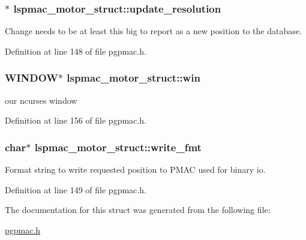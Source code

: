 \hypertarget{structlspmac__motor__struct_aefa84c7592369090eec8b211caaa3a51}{
\subsubsection[{update\-\_\-resolution}]{$\ast$ lspmac\-\_\-motor\-\_\-struct\-::update\-\_\-resolution}}\label{structlspmac__motor__struct_aefa84c7592369090eec8b211caaa3a51}


Change needs to be at least this big to report as a new position to the database. 



Definition at line 148 of file pgpmac.\-h.

\hypertarget{structlspmac__motor__struct_a133775154b0e008f3a2fde6f53bc0eff}{
\subsubsection[{win}]{\setlength{\rightskip}{0pt plus 5cm}W\-I\-N\-D\-O\-W$\ast$ lspmac\-\_\-motor\-\_\-struct\-::win}}\label{structlspmac__motor__struct_a133775154b0e008f3a2fde6f53bc0eff}


our ncurses window 



Definition at line 156 of file pgpmac.\-h.

\hypertarget{structlspmac__motor__struct_a70291ddfe7994c0bec7fc2287cb6dd89}{
\subsubsection[{write\-\_\-fmt}]{\setlength{\rightskip}{0pt plus 5cm}char$\ast$ lspmac\-\_\-motor\-\_\-struct\-::write\-\_\-fmt}}\label{structlspmac__motor__struct_a70291ddfe7994c0bec7fc2287cb6dd89}


Format string to write requested position to P\-M\-A\-C used for binary io. 



Definition at line 149 of file pgpmac.\-h.



The documentation for this struct was generated from the following file\-:\begin{DoxyCompactItemize}
\item 
\hyperlink{pgpmac_8h}{pgpmac.\-h}\end{DoxyCompactItemize}
